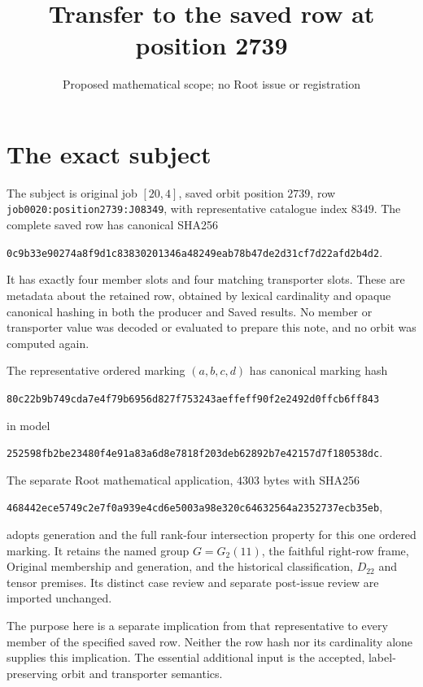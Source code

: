 \documentclass[11pt]{article}
\title{Transfer to the saved row at position 2739}
\author{Proposed mathematical scope; no Root issue or registration}
\date{}
\begin{document}
\maketitle

\section*{The exact subject}

The subject is original job $[20,4]$, saved orbit position $2739$, row
\texttt{job0020:position2739:J08349}, with representative catalogue index
$8349$.  The complete saved row has canonical SHA256
\begin{center}\small\texttt{0c9b33e90274a8f9d1c83830201346a48249eab78b47de2d31cf7d22afd2b4d2}.\end{center}
It has exactly four member slots and four matching transporter slots.
These are metadata about the retained row, obtained by lexical cardinality
and opaque canonical hashing in both the producer and Saved results.
No member or transporter value was decoded or evaluated to prepare this
note, and no orbit was computed again.

The representative ordered marking $(a,b,c,d)$ has canonical marking hash
\begin{center}\small\texttt{80c22b9b749cda7e4f79b6956d827f753243aeffeff90f2e2492d0ffcb6ff843}\end{center}
in model
\begin{center}\small\texttt{252598fb2be23480f4e91a83a6d8e7818f203deb62892b7e42157d7f180538dc}.\end{center}
The separate Root mathematical application, $4303$ bytes with SHA256
\begin{center}\small\texttt{468442ece5749c2e7f0a939e4cd6e5003a98e320c64632564a2352737ecb35eb},\end{center}
adopts generation and the full rank-four intersection property for this
one ordered marking.  It retains the named group $G=G_2(11)$, the faithful
right-row frame, Original membership and generation, and the historical
classification, $D_{22}$ and tensor premises.  Its distinct case review
and separate post-issue review are imported unchanged.

The purpose here is a separate implication from that representative to
every member of the specified saved row.  Neither the row hash nor its
cardinality alone supplies this implication.  The essential additional
input is the accepted, label-preserving orbit and transporter semantics.
\end{document}
